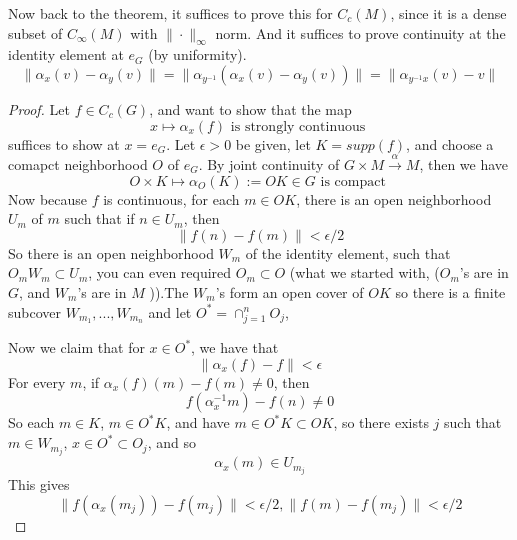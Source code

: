 Now back to the theorem, it suffices to prove this for $C_c(M)$, since it is a dense subset of $C_\infty(M)$ with $\|\cdot\|_\infty$ norm. And it suffices to prove continuity at the identity element at $e_G$ (by uniformity).
\begin{equation*}
    \|\alpha_x(v)-\alpha_y(v)\|=\|\alpha_{y^{-1}}(\alpha_x(v)-\alpha_y(v))\|=\|\alpha_{y^{-1}x}(v)-v\|
\end{equation*}
\begin{proof}
    Let $f\in C_c(G)$, and want to show that the map
    \begin{equation*}
        x\mapsto \alpha_x(f) \text{ is strongly continuous }
    \end{equation*}
    suffices to show at $x=e_G$. Let $\epsilon>0$ be given, let $K=supp(f)$, and choose a comapct neighborhood $O$ of $e_G$. By joint continuity of $G\times M\xrightarrow{\alpha} M$, then we have
    \begin{equation*}
        O\times K\mapsto \alpha_O(K):=OK\in G \text{ is compact }
    \end{equation*}
    Now because $f$ is continuous, for each $m\in OK$, there is an open neighborhood $U_m$ of $m$ such that if $n\in U_m$, then 
    \begin{equation*}
        \|f(n)-f(m)\|<\epsilon/2
    \end{equation*}
    So there is an open neighborhood $W_m$ of the identity element, such that $O_m W_m\subset U_m$, you can even required $O_m\subset O$ (what we started with, ($O_m$'s are in $G$, and $W_m$'s are in $M$ )).The $W_m$'s form an open cover of $OK$ so there is a finite subcover $W_{m_1}, ..., W_{m_n}$ and let $O^*=\cap_{j=1}^n O_j$,

    Now we claim that for $x\in O^*$, we have that
    \begin{equation*}
        \|\alpha_x(f)-f\|<\epsilon
    \end{equation*}
    For every $m$, if $\alpha_x(f)(m)-f(m)\neq 0$, then 
    \begin{equation*}
        f(\alpha_x^{-1}m)-f(n)\neq 0
    \end{equation*}
    So each $m\in K$, $m\in O^*K$, and have $m\in O^*K\subset OK$, so there exists $j$ such that $m\in W_{m_j}$, $x\in O^*\subset O_j$, and so 
    \begin{equation*}
        \alpha_x(m)\in U_{m_j}
    \end{equation*}
    This gives
    \begin{equation*}
        \|f(\alpha_x(m_j))-f(m_j)\|<\epsilon/2, \|f(m)-f(m_j)\|<\epsilon/2
    \end{equation*}
\end{proof}

